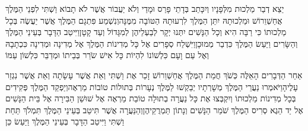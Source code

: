 \documentclass[../main/main.tex]{subfiles}
\begin{document}
\begin{multicols*}{\ncols}
יֵצֵא דְבַר מַלְכוּת מִלְּפָנָיו וְיִכָּתֵב בְּדָתֵי פָרַס וּמָדַי וְלֹא יַעֲבוֹר אֲשֶׁר לֹא תָבוֹא וַשְׁתִּי לִפְנֵי הַמֶּלֶךְ אֲחַשְׁוֵרוֹשׁ וּמַלְכוּתָהּ יִתֵּן הַמֶּלֶךְ לִרְעוּתָהּ הַטּוֹבָה מִמֶּנָּה\PreVerseSpace{}וְנִשְׁמַע פִּתְגָם הַמֶּלֶךְ אֲשֶׁר יַעֲשֶׂה בְּכָל מַלְכוּתוֹ כִּי רַבָּה הִיא וְכָל הַנָּשִׁים יִתְּנוּ יְקָר לְבַעְלֵיהֶן לְמִגָּדוֹל וְעַד קָטָן\PreVerseSpace{}וַיִּיטַב הַדָּבָר בְּעֵינֵי הַמֶּלֶךְ וְהַשָּׂרִים וַיַּעַשׂ הַמֶּלֶךְ כִּדְבַר מְמוּכָן\PreVerseSpace{}וַיִּשְׁלַח סְפָרִים אֶל כָּל מְדִינוֹת הַמֶּלֶךְ אֶל מְדִינָה וּמְדִינָה כִּכְתָבָהּ וְאֶל עַם וָעָם כִּלְשׁוֹנוֹ לִהְיוֹת כָּל אִישׁ שֹׂרֵר בְּבֵיתוֹ וּמְדַבֵּר כִּלְשׁוֹן עַמּוֹ\OpenSection{}\par
{}אַחַר הַדְּבָרִים הָאֵלֶּה כְּשֹׁךְ חֲמַת הַמֶּלֶךְ אֲחַשְׁוֵרוֹשׁ זָכַר אֶת וַשְׁתִּי וְאֵת אֲשֶׁר עָשָׂתָה וְאֵת אֲשֶׁר נִגְזַר עָלֶיהָ\PreVerseSpace{}וַיֹּאמְרוּ נַעֲרֵי הַמֶּלֶךְ מְשָׁרְתָיו יְבַקְשׁוּ לַמֶּלֶךְ נְעָרוֹת בְּתוּלוֹת טוֹבוֹת מַרְאֶה\PreVerseSpace{}וְיַפְקֵד הַמֶּלֶךְ פְּקִידִים בְּכָל מְדִינוֹת מַלְכוּתוֹ וְיִקְבְּצוּ אֶת כָּל נַעֲרָה בְתוּלָה טוֹבַת מַרְאֶה אֶל שׁוּשַׁן הַבִּירָה אֶל בֵּית הַנָּשִׁים אֶל יַד הֵגֶא סְרִיס הַמֶּלֶךְ שֹׁמֵר הַנָּשִׁים וְנָתוֹן תַּמְרֻקֵיהֶן\PreVerseSpace{}וְהַנַּעֲרָה אֲשֶׁר תִּיטַב בְּעֵינֵי הַמֶּלֶךְ תִּמְלֹךְ תַּחַת וַשְׁתִּי וַיִּיטַב הַדָּבָר בְּעֵינֵי הַמֶּלֶךְ וַיַּעַשׂ כֵּן\OpenSection{}\par

\end{multicols*}
\end{document}
